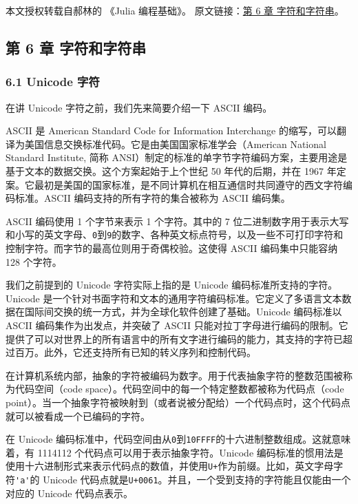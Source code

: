 
本文授权转载自郝林的 《Julia 编程基础》。 原文链接：\href{https://github.com/hyper0x/JuliaBasics/blob/master/book/ch06.md}{第 6 章 字符和字符串}。


\subsection{第 6 章 字符和字符串}

\subsubsection{6.1 Unicode 字符}

在讲 Unicode 字符之前，我们先来简要介绍一下 ASCII 编码。

ASCII 是 American Standard Code for Information Interchange 的缩写，可以翻译为美国信息交换标准代码。它是由美国国家标准学会（American National Standard Institute, 简称 ANSI）制定的标准的单字节字符编码方案，主要用途是基于文本的数据交换。这个方案起始于上个世纪 50 年代的后期，并在 1967 年定案。它最初是美国的国家标准，是不同计算机在相互通信时共同遵守的西文字符编码标准。ASCII 编码支持的所有字符的集合被称为 ASCII 编码集。

ASCII 编码使用 1 个字节来表示 1 个字符。其中的 7 位二进制数字用于表示大写和小写的英文字母、\verb|0|到\verb|9|的数字、各种英文标点符号，以及一些不可打印字符和控制字符。而字节的最高位则用于奇偶校验。这使得 ASCII 编码集中只能容纳 128 个字符。

我们之前提到的 Unicode 字符实际上指的是 Unicode 编码标准所支持的字符。Unicode 是一个针对书面字符和文本的通用字符编码标准。它定义了多语言文本数据在国际间交换的统一方式，并为全球化软件创建了基础。Unicode 编码标准以 ASCII 编码集作为出发点，并突破了 ASCII 只能对拉丁字母进行编码的限制。它提供了可以对世界上的所有语言中的所有文字进行编码的能力，其支持的字符已超过百万。此外，它还支持所有已知的转义序列和控制代码。

在计算机系统内部，抽象的字符被编码为数字。用于代表抽象字符的整数范围被称为代码空间（code space）。代码空间中的每一个特定整数都被称为代码点（code point）。当一个抽象字符被映射到（或者说被分配给）一个代码点时，这个代码点就可以被看成一个已编码的字符。

在 Unicode 编码标准中，代码空间由从\verb|0|到\verb|10FFFF|的十六进制整数组成。这就意味着，有 1114112 个代码点可以用于表示抽象字符。Unicode 编码标准的惯用法是使用十六进制形式来表示代码点的数值，并使用\verb|U+|作为前缀。比如，英文字母字符\verb|'a'|的 Unicode 代码点就是\verb|U+0061|。并且，一个受到支持的字符能且仅能由一个对应的 Unicode 代码点表示。

